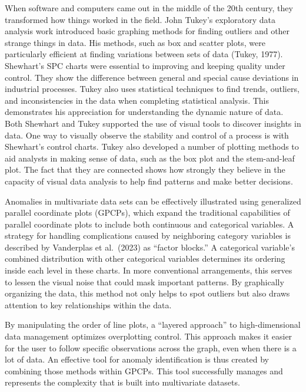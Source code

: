 \documentclass[print]{nuthesis}
\begin{document}
When software and computers came out in the middle of the 20th century, they transformed how things worked in the field.
John Tukey's exploratory data analysis work introduced basic graphing methods for finding outliers and other strange things in data.
His methods, such as box and scatter plots, were particularly efficient at finding variations between sets of data (Tukey, 1977). Shewhart's SPC charts were essential to improving and keeping quality under control.
They show the difference between general and special cause deviations in industrial processes.
Tukey also uses statistical techniques to find trends, outliers, and inconsistencies in the data when completing statistical analysis. This demonstrates his appreciation for understanding the dynamic nature of data.
Both Shewhart and Tukey supported the use of visual tools to discover insights in data.
One way to visually observe the stability and control of a process is with Shewhart's control charts.
Tukey also developed a number of plotting methods to aid analysts in making sense of data, such as the box plot and the stem-and-leaf plot.
The fact that they are connected shows how strongly they believe in the capacity of visual data analysis to help find patterns and make better decisions.

Anomalies in multivariate data sets can be effectively illustrated using generalized parallel coordinate plots (GPCPs), which expand the traditional capabilities of parallel coordinate plots to include both continuous and categorical variables.
A strategy for handling complications caused by neighboring category variables is described by Vanderplas et al.~(2023) as ``factor blocks.''
A categorical variable's combined distribution with other categorical variables determines its ordering inside each level in these charts.
In more conventional arrangements, this serves to lessen the visual noise that could mask important patterns.
By graphically organizing the data, this method not only helps to spot outliers but also draws attention to key relationships within the data.

By manipulating the order of line plots, a ``layered approach'' to high-dimensional data management optimizes overplotting control.
This approach makes it easier for the user to follow specific observations across the graph, even when there is a lot of data.
An effective tool for anomaly identification is thus created by combining those methods within GPCPs. This tool successfully manages and represents the complexity that is built into multivariate datasets.
\end{document}
